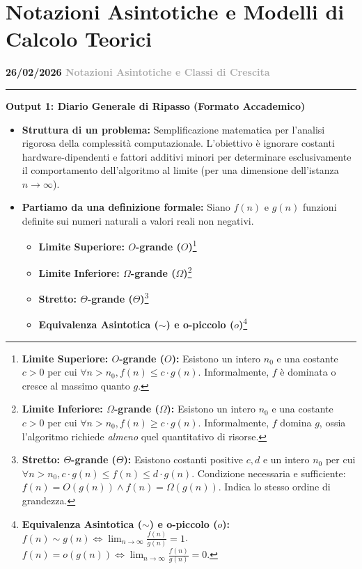 \documentclass[a4paper, 11pt]{report}
\newcommand{\lezione}[2]{
\vspace{2em}
\noindent\textbf{\Large #1 \hfill \textcolor{darkgray}{#2}}
\vspace{0.5em}
\hrule
\vspace{1.5em}
}
\newcommand{\definizione}[2]{%
\textbf{#1}\footnote{\textbf{#1:} #2}%
}
\begin{document}
\chapter{Notazioni Asintotiche e Modelli di Calcolo Teorici}

\lezione{26/02/2026}{Notazioni Asintotiche e Classi di Crescita}
\vspace{0.5cm}
\textbf{Output 1: Diario Generale di Ripasso (Formato Accademico)}
\begin{itemize}
\item \textbf{Struttura di un problema:} Semplificazione matematica per l'analisi rigorosa della complessità computazionale. L'obiettivo è ignorare costanti hardware-dipendenti e fattori additivi minori per determinare esclusivamente il comportamento dell'algoritmo al limite (per una dimensione dell'istanza $n \to \infty$).

\item \textbf{Partiamo da una definizione formale:} Siano $f(n)$ e $g(n)$ funzioni definite sui numeri naturali a valori reali non negativi.
\begin{itemize}
    \item \definizione{Limite Superiore: $O$-grande ($O$)}{Esistono un intero $n_0$ e una costante $c > 0$ per cui $\forall n > n_0, f(n) \le c \cdot g(n)$. Informalmente, $f$ è dominata o cresce al massimo quanto $g$.}
    \item \definizione{Limite Inferiore: $\Omega$-grande ($\Omega$)}{Esistono un intero $n_0$ e una costante $c > 0$ per cui $\forall n > n_0, f(n) \ge c \cdot g(n)$. Informalmente, $f$ domina $g$, ossia l'algoritmo richiede \textit{almeno} quel quantitativo di risorse.}
    \item \definizione{Stretto: $\Theta$-grande ($\Theta$)}{Esistono costanti positive $c, d$ e un intero $n_0$ per cui $\forall n > n_0, c \cdot g(n) \le f(n) \le d \cdot g(n)$. Condizione necessaria e sufficiente: $f(n) = O(g(n)) \land f(n) = \Omega(g(n))$. Indica lo stesso ordine di grandezza.}
    \item \definizione{Equivalenza Asintotica ($\sim$) e o-piccolo ($o$)}{$f(n) \sim g(n) \iff \lim_{n \to \infty} \frac{f(n)}{g(n)} = 1$. $f(n) = o(g(n)) \iff \lim_{n \to \infty} \frac{f(n)}{g(n)} = 0$.}
\end{itemize}


\end{itemize}
\end{document}
